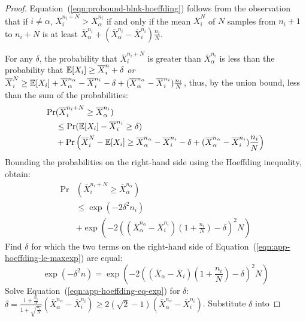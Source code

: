\begin{proof}
	Equation~(\ref{eqn:probound-blnk-hoeffding}) follows from the
	observation that if $i\ne\alpha$, $\overline X_i^{n_i+N}>\overline X_\alpha^{n_i}$
	if and only if the mean $\overline X_i^N$ of $N$ samples from $n_i+1$
	to $n_i+N$ is at least $\overline X_\alpha^{n_i}+(\overline X_\alpha^{n_i}-\overline
	X_i^{n_i})\frac {n_i} N$.

	For any $\delta$, the probability that $\overline X_i^{n_i+N}$ is greater
	than $\overline X_\alpha^{n_i}$ is less than the probability that
	$\mathbb{E}[X_i]\ge\overline X_i^n+\delta$
	\emph{or} $\overline X_i^N\ge \mathbb{E}[X_i]+\overline X_\alpha^{n_\alpha}
	- \overline X_i^{n_i} - \delta +(\overline X_\alpha^{n_\alpha} - \overline X_i^{n_i})\frac {n_i} N$,
	thus, by the union bound, less than the sum of the probabilities:
	\begin{align}
	\Pr&(\overline X_i^{n_i+N}\ge \overline X_\alpha^{n_i})\nonumber\\
	   &\le\Pr(\mathbb{E}[X_i]-\overline X_i^{n_i} \ge \delta)\\
	   &+\Pr\left(\overline X_i^N - \mathbb{E}[X_i] \ge \overline X_\alpha^{n_\alpha}
	           - \overline X_i^{n_i} - \delta +(\overline X_\alpha^{n_\alpha} - \overline X_i^{n_i})\frac {n_i} N\right)\nonumber
	\end{align}
	Bounding the probabilities on the right-hand side using the Hoeffding
	inequality, obtain:
	\begin{align}
	\Pr&(\overline X_i^{n_i+N}\ge \overline X_\alpha^{n_\alpha})\nonumber\\
	    &\le\exp(-2\delta^2n_i)\nonumber\\
	    &+\exp\left(-2\left((\overline X_\alpha^{n_\alpha}
	         - \overline X_i^{n_i})\left(1+\frac {n_i} N\right)
	         - \delta\right)^2N\right)
	\label{eqn:app-hoeffding-le-maxexp}
	\end{align}
	Find $\delta$ for which the two terms on the right-hand side of
	Equation~(\ref{eqn:app-hoeffding-le-maxexp}) are equal:
	\begin{equation}
	\exp(-\delta^2n) = \exp\left(-2\left((\overline X_\alpha - \overline X_i)(1+\frac {n_i} N) - \delta\right)^2N\right)\label{eqn:app-hoeffding-eq-exp}
	\end{equation}
	Solve Equation~(\ref{eqn:app-hoeffding-eq-exp}) for $\delta$: $\delta=\frac {1+\frac {n_i} N} {1+\sqrt {\frac {n_i} N}} (\overline X_\alpha^{n_\alpha}
	- \overline X_i^{n_i}) \ge 2(\sqrt 2 - 1)(\overline X_\alpha^{n_\alpha}-\overline X_i^{n_i})$. Substitute $\delta$ into 

\end{proof}
